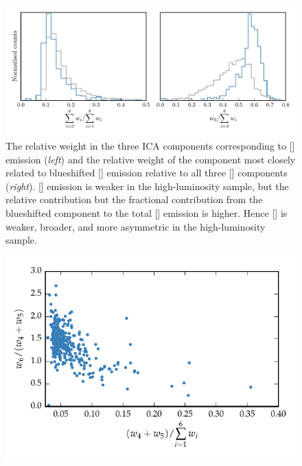 \begin{figure}
    \centering
    \includegraphics[width=\textwidth]{figures/chapter04/mfica_oiii_weight.pdf} 
    \caption{The relative weight in the three ICA components corresponding to [] emission ({\em left}) and the relative weight of the component most closely related to blueshifted [] emission relative to all three [] components ({\em right}). [] emission is weaker in the high-luminosity sample, but the relative contribution but the fractional contribution from the blueshifted component to the total [] emission is higher. Hence [] is weaker, broader, and more asymmetric in the high-luminosity sample.}     
    \label{fig:mfica_oiii_weight}
\end{figure}

\begin{figure}
    \centering
    \includegraphics[width=\columnwidth]{figures/chapter04/oiii_core_strength_blueshift.pdf} 
    \caption{}     
    \label{fig:oiii_core_strength_blueshift}
\end{figure}

